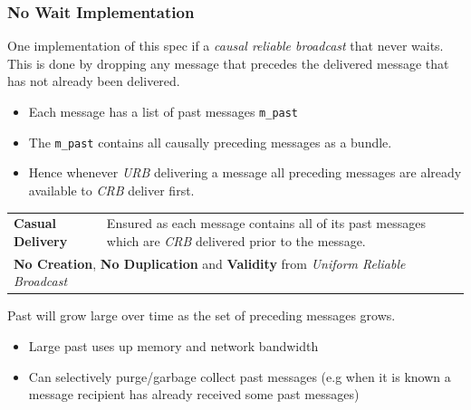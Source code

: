 \subsubsection{No Wait Implementation}
One implementation of this spec if a \textit{causal reliable broadcast} that never waits. This is done by dropping any message that precedes the delivered message that has not already been delivered.
\begin{itemize}
    \item Each message has a list of past messages \texttt{m_past}
    \item The \texttt{m_past} contains all causally preceding messages as a bundle.
    \item Hence whenever \textit{URB} delivering a message all preceding messages are already available to \textit{CRB} deliver first.
\end{itemize}
\begin{center}
    \begin{tabular}{l p{}}
        \textbf{Casual Delivery} & Ensured as each message contains all of its past messages which are \textit{CRB} delivered prior to the message. \\
        \multicolumn{2}{l}{\textbf{No Creation}, \textbf{No Duplication} and \textbf{Validity} from \textit{Uniform Reliable Broadcast}} \\
    \end{tabular}
\end{center}
Past will grow large over time as the set of preceding messages grows.
\begin{itemize}
    \item Large past uses up memory and network bandwidth
    \item Can selectively purge/garbage collect past messages (e.g when it is known a message recipient has already received some past messages)
\end{itemize}
\inputminted{elixir}{broadcast/code/causal_reliable_broadcast_no_wait.ex}

